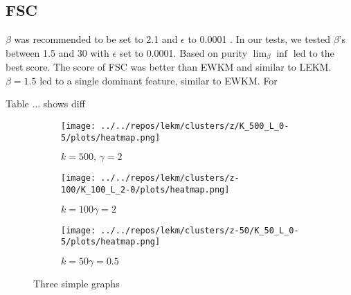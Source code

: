 \documentclass[../report.tex]{subfiles}
\begin{document}
\subsection{FSC}
$\beta$ was recommended to be set to 2.1 and $\epsilon$ to 0.0001 \cite{Gan2006}. In our tests, we tested $\beta$'s between 1.5 and 30 with $\epsilon$ set to 0.0001. Based on purity $\lim_{\beta}{\inf}$ led to the best score. The score of FSC was better than EWKM and similar to LEKM. $\beta = 1.5$ led to a single dominant feature, similar to EWKM. For 

Table ... shows diff

\begin{figure}
     \centering
     \begin{subfigure}[b]{0.3\textwidth}
         \centering
         \texttt{[image: ../../repos/lekm/clusters/z/K\_500\_L\_0-5/plots/heatmap.png]}
         \caption{$k=500 \text{, } \gamma=2$}
         \label{fig:y equals x}
     \end{subfigure}
     \hfill
     \begin{subfigure}[b]{0.3\textwidth}
         \centering
         \texttt{[image: ../../repos/lekm/clusters/z-100/K\_100\_L\_2-0/plots/heatmap.png]}

         \caption{$k=100 \gamma=2$}
         \label{fig:three sin x}
     \end{subfigure}
     \hfill
     \begin{subfigure}[b]{0.3\textwidth}
         \centering
         \texttt{[image: ../../repos/lekm/clusters/z-50/K\_50\_L\_0-5/plots/heatmap.png]}
         \caption{$k=50 \gamma=0.5$}
         \label{fig:five over x}
     \end{subfigure}
        \caption{Three simple graphs}
        \label{fig:three graphs}
\end{figure}
\end{document}
